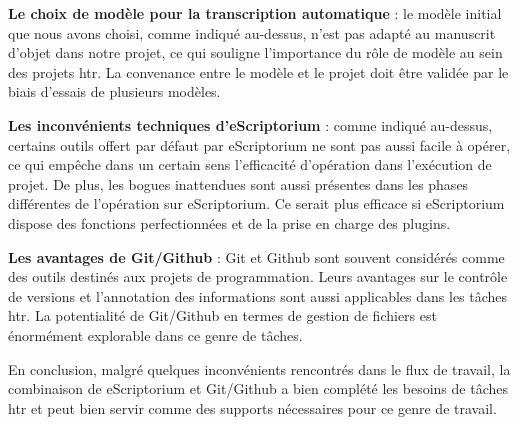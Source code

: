\documentclass[12pt]{article}
\begin{document}
\textbf{Le choix de modèle pour la transcription automatique} : le modèle initial que nous avons choisi, comme indiqué au-dessus, n’est pas adapté au manuscrit d’objet dans notre projet, ce qui souligne l’importance du rôle de modèle au sein des projets \acrshort{htr}. La convenance entre le modèle et le projet doit être validée par le biais d'essais de plusieurs modèles.

\textbf{Les inconvénients techniques d’eScriptorium} : comme indiqué au-dessus, certains outils offert par défaut par eScriptorium ne sont pas aussi facile à opérer, ce qui empêche dans un certain sens l'efficacité d’opération dans l’exécution de projet. De plus, les bogues inattendues sont aussi présentes dans les phases différentes de l’opération sur eScriptorium. Ce serait plus efficace si eScriptorium dispose des fonctions perfectionnées et de la prise en charge des plugins.

\textbf{Les avantages de Git/Github} : Git et Github sont souvent considérés comme des outils destinés aux projets de programmation. Leurs avantages sur le contrôle de versions et l’annotation des informations sont aussi applicables dans les tâches \acrshort{htr}. La potentialité de Git/Github en termes de gestion de fichiers est énormément explorable dans ce genre de tâches.

En conclusion, malgré quelques inconvénients rencontrés dans le flux de travail, la combinaison de eScriptorium et Git/Github a bien complété les besoins de tâches \acrshort{htr} et peut bien servir comme des supports nécessaires pour ce genre de travail.
\end{document}
